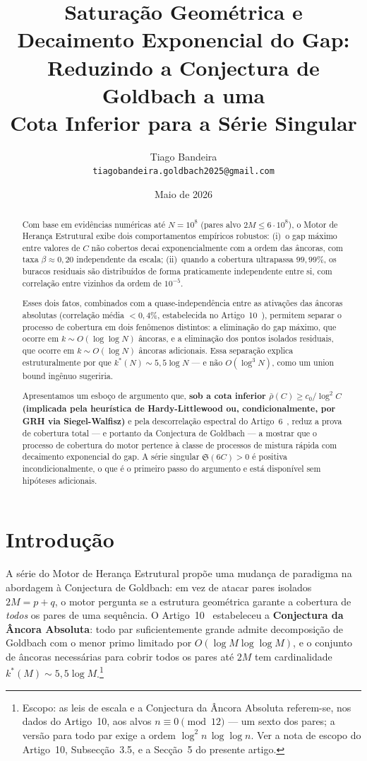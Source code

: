 \documentclass[11pt]{article}
\title{Saturação Geométrica e Decaimento Exponencial do Gap:\\
	Reduzindo a Conjectura de Goldbach a uma\\
	Cota Inferior para a Série Singular}
\author{Tiago Bandeira \\ \texttt{tiagobandeira.goldbach2025@gmail.com}}
\date{Maio de 2026}
\theoremstyle{definition}
\begin{document}
	
	\maketitle
	
	\begin{abstract}
		Com base em evidências numéricas até $N = 10^8$ (pares alvo $2M \le 6\cdot10^8$), o Motor de Herança Estrutural exibe dois comportamentos empíricos robustos: (i)~o gap máximo entre valores de $C$ não cobertos decai exponencialmente com a ordem das âncoras, com taxa $\beta \approx 0{,}20$ independente da escala; (ii)~quando a cobertura ultrapassa $99{,}99\%$, os buracos residuais são distribuídos de forma praticamente independente entre si, com correlação entre vizinhos da ordem de $10^{-5}$.
		
		Esses dois fatos, combinados com a quase-independência entre as ativações das âncoras absolutas (correlação média $<0{,}4\%$, estabelecida no Artigo~10~\cite{art10}), permitem separar o processo de cobertura em dois fenômenos distintos: a eliminação do gap máximo, que ocorre em $k\sim O(\log\log N)$ âncoras, e a eliminação dos pontos isolados residuais, que ocorre em $k\sim O(\log N)$ âncoras adicionais. Essa separação explica estruturalmente por que $k^*(N)\sim 5{,}5\log N$ — e não $O(\log^3 N)$, como um union bound ingênuo sugeriria.
		
		Apresentamos um esboço de argumento que, \textbf{sob a cota inferior $\bar\rho(C)\ge c_0/\log^2 C$ (implicada pela heurística de Hardy-Littlewood ou, condicionalmente, por GRH via Siegel-Walfisz)} e pela descorrelação espectral do Artigo~6~\cite{art6}, reduz a prova de cobertura total — e portanto da Conjectura de Goldbach — a mostrar que o processo de cobertura do motor pertence à classe de processos de mistura rápida com decaimento exponencial do gap. A série singular $\mathfrak{S}(6C)>0$ é positiva incondicionalmente, o que é o primeiro passo do argumento e está disponível sem hipóteses adicionais.
	\end{abstract}
	
	\section{Introdução}
	
	A série do Motor de Herança Estrutural \cite{art1,art2,art3,art4,art5,art6,art7,art8,art9,art10} propõe uma mudança de paradigma na abordagem à Conjectura de Goldbach: em vez de atacar pares isolados $2M = p + q$, o motor pergunta se a estrutura geométrica garante a cobertura de \emph{todos} os pares de uma sequência. O Artigo~10~\cite{art10} estabeleceu a \textbf{Conjectura da Âncora Absoluta}: todo par suficientemente grande admite decomposição de Goldbach com o menor primo limitado por $O(\log M\log\log M)$, e o conjunto de âncoras necessárias para cobrir todos os pares até $2M$ tem cardinalidade $k^*(M)\sim 5{,}5\log M$.\footnote{Escopo: as leis de escala e a Conjectura da Âncora Absoluta referem-se, nos dados do Artigo~10, aos alvos $n\equiv0\pmod{12}$ — um sexto dos pares; a versão para todo par exige a ordem $\log^2n\,\log\log n$. Ver a nota de escopo do Artigo~10, Subsecção~3.5, e a Secção~5 do presente artigo.}
	
\end{document}
